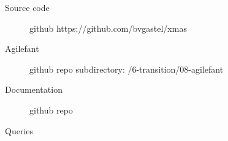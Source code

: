 \documentclass[11pt]{beamer}
\begin{document}
\begin{frame}
	\begin{description}
		\item[Source code] github https://github.com/bvgastel/xmas
		\item[Agilefant] github repo subdirectory: /6-transition/08-agilefant
		\item[Documentation] github repo
	\end{description}
\end{frame}

\begin{frame}
	\begin{center}
		\huge{Queries}
	\end{center}
\end{frame}
\end{document}

